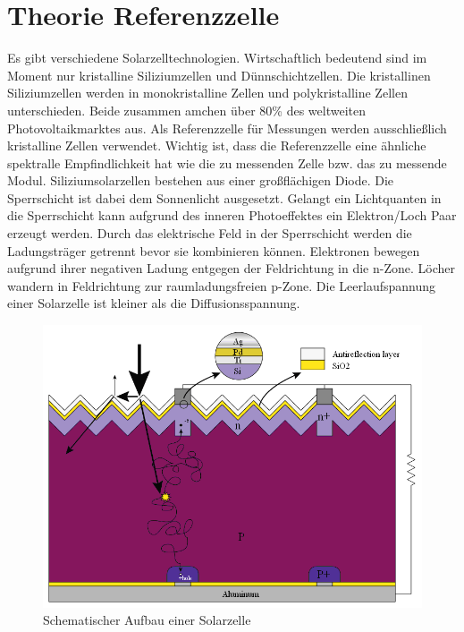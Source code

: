 \documentclass[a4paper,bibtotoc,oneside]{scrbook}
\begin{document}
\section{Theorie Referenzzelle}\thispagestyle{empty}
Es gibt verschiedene Solarzelltechnologien. Wirtschaftlich bedeutend sind im Moment nur kristalline Siliziumzellen und Dünnschichtzellen. Die kristallinen Siliziumzellen werden in monokristalline Zellen und polykristalline Zellen unterschieden. Beide zusammen amchen über 80\% des weltweiten Photovoltaikmarktes aus. Als Referenzzelle für Messungen werden ausschließlich kristalline Zellen verwendet. Wichtig ist, dass die Referenzzelle eine ähnliche spektralle Empfindlichkeit hat wie die zu messenden Zelle bzw. das zu messende Modul.
Siliziumsolarzellen bestehen aus einer großflächigen Diode. Die Sperrschicht ist dabei dem Sonnenlicht ausgesetzt. Gelangt ein Lichtquanten in die Sperrschicht kann aufgrund des inneren Photoeffektes ein Elektron/Loch Paar erzeugt werden. Durch das elektrische Feld in der Sperrschicht werden die Ladungsträger getrennt bevor sie kombinieren können. Elektronen bewegen aufgrund ihrer negativen Ladung entgegen der Feldrichtung in die n-Zone. Löcher wandern in Feldrichtung zur raumladungsfreien p-Zone. Die Leerlaufspannung einer Solarzelle ist kleiner als die Diffusionsspannung.
\begin{figure}[htbp]
\centering
\includegraphics[width=125mm]{img/cell.png}
\caption{Schematischer Aufbau einer Solarzelle}\label{cell}
\end{figure}
\end{document}
